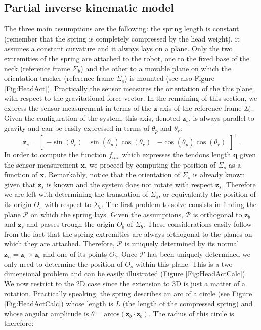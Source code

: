 \documentclass[conference]{IEEEtran}
\numberwithin{equation}{section}
\newcommand{\q}{\mathbf{q}}
\newcommand{\x}{\mathbf{x}}
\begin{document}
\subsection{Partial inverse kinematic model} \label{Sec:PartialInverseKinematicModel}

The three main assumptions are the following: the spring length is constant (remember that the spring is completely compressed by the head weight), it assumes a constant curvature and it always lays on a plane. Only the two extremities of the spring are attached to the robot, one to the fixed base of the neck (reference frame $\Sigma_b$) and the other to a movable plane on which the orientation tracker (reference frame $\Sigma_s$) is mounted (see also Figure \ref{Fig:HeadAct}). Practically the sensor measures the orientation of the this plane with respect to the gravitational force vector. In the remaining of this section, we express the sensor measurement in terms of the $\mathbf z$-axis of the reference frame $\Sigma_s$. Given the configuration of the system, this axis, denoted $\mathbf z_s$, is always parallel to gravity and can be easily expressed in terms of $\theta_p$ and $\theta_r$:
$$ \mathbf z_s = \begin{bmatrix}  -\sin(\theta_r) & \sin(\theta_p)\cos(\theta_r) & -\cos(\theta_p)\cos(\theta_r)\end{bmatrix}^\top.$$
In order to compute the function $f_{inv}$ which expresses the tendons length $\q$ given the sensor measurement $\x$, we proceed by computing the position of $\Sigma_s$ as a function of $\x$. Remarkably, notice that the orientation of $\Sigma_s$ is already known given that $\mathbf z_s$ is known and the system does not rotate with respect $\mathbf z_s$. Therefore we are left with determining the translation of $\Sigma_s$, or equivalently the position of its origin $O_s$ with respect to $\Sigma_b$. The first problem to solve consists in finding the plane $\mathcal P$ on which the spring lays. Given  the assumptions, $\mathcal P$ is orthogonal to $\mathbf z_b$ and $\mathbf z_s$ and passes trough the origin $O_b$ of $\Sigma_b$. These considerations easily follow from the fact that the spring extremities are always orthogonal to the planes on which they are attached. Therefore, $\mathcal P$ is uniquely determined by its normal $\mathbf z_n = \mathbf z_s \times \mathbf z_b$ and one of its points $O_b$. Once $\mathcal P$ has been uniquely determined we only need to determine the position of $O_s$ within this plane. This is a two dimensional problem and can be easily illustrated (Figure \ref{Fig:HeadActCalc}). We now restrict to the 2D case since the extension to 3D is just a matter of a rotation. Practically speaking, the spring describes an arc of a circle (see Figure \ref{Fig:HeadActCalc}) whose length is $L$ (the length of the compressed spring) and whose angular amplitude is $\theta = \mbox{arcos}(\mathbf z_b \cdot \mathbf z_b) $. The radius of this circle is therefore:
\end{document}
